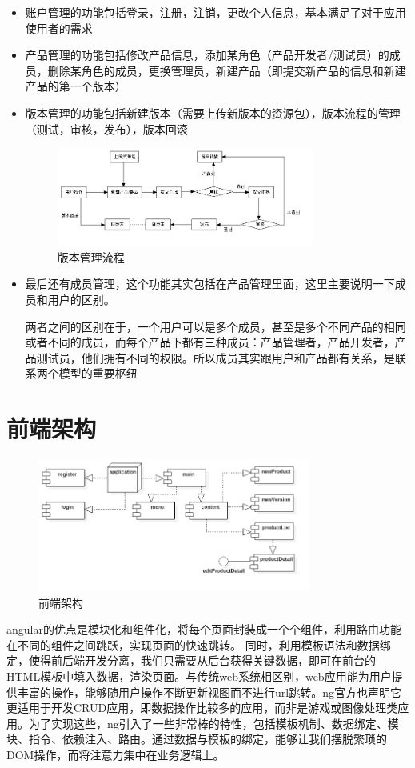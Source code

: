 \begin{itemize}
	\item 账户管理的功能包括登录，注册，注销，更改个人信息，基本满足了对于应用使用者的需求
	\item 产品管理的功能包括修改产品信息，添加某角色（产品开发者/测试员）的成员，删除某角色的成员，更换管理员，新建产品（即提交新产品的信息和新建产品的第一个版本）
	\item 版本管理的功能包括新建版本（需要上传新版本的资源包），版本流程的管理（测试，审核，发布），版本回滚
	\begin{figure}[h]
		\centering
		\includegraphics[width=0.8\textwidth]{image/UML/FlowchartDiagram.png}
		\caption{版本管理流程}
		\label{fig:version}
	\end{figure}
	\item 最后还有成员管理，这个功能其实包括在产品管理里面，这里主要说明一下成员和用户的区别。

	两者之间的区别在于，一个用户可以是多个成员，甚至是多个不同产品的相同或者不同的成员，而每个产品下都有三种成员：产品管理者，产品开发者，产品测试员，他们拥有不同的权限。所以成员其实跟用户和产品都有关系，是联系两个模型的重要枢纽
\end{itemize}

\section{前端架构}
\label{sec:Front-end_architecture}
\begin{figure}[h]
	\centering
	\includegraphics[width=0.8\textwidth]{image/UML/ComponentDiagram.png}
	\caption{前端架构}
	\label{fig:frame}
\end{figure}
angular的优点是模块化和组件化，将每个页面封装成一个个组件，利用路由功能在不同的组件之间跳跃，实现页面的快速跳转。
同时，利用模板语法和数据绑定，使得前后端开发分离，我们只需要从后台获得关键数据，即可在前台的HTML模板中填入数据，渲染页面。与传统web系统相区别，web应用能为用户提供丰富的操作，能够随用户操作不断更新视图而不进行url跳转。ng官方也声明它更适用于开发CRUD应用，即数据操作比较多的应用，而非是游戏或图像处理类应用。为了实现这些，ng引入了一些非常棒的特性，包括模板机制、数据绑定、模块、指令、依赖注入、路由。通过数据与模板的绑定，能够让我们摆脱繁琐的DOM操作，而将注意力集中在业务逻辑上。

